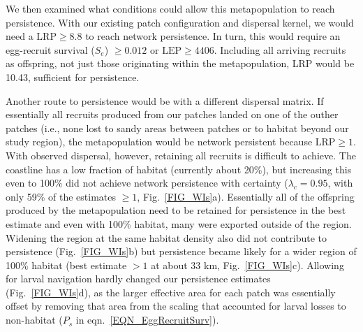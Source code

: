 \documentclass[12pt, oneside]{article}   	%
\begin{document}
We then examined what conditions could allow this metapopulation to reach persistence. With our existing patch configuration and dispersal kernel, we would need a $\text{LRP} \geq 8.8$ to reach network persistence. In turn, this would require an egg-recruit survival ($S_e$) $\geq 0.012$ or $\text{LEP} \geq 4406$. Including all arriving recruits as offspring, not just those originating within the metapopulation, LRP would be 10.43, sufficient for persistence. 
 
Another route to persistence would be with a different dispersal matrix. If essentially all recruits produced from our patches landed on one of the outher patches (i.e., none lost to sandy areas between patches or to habitat beyond our study region), the metapopulation would be network persistent because $\text{LRP} \geq 1$. With observed dispersal, however, retaining all recruits is difficult to achieve. The coastline has a low fraction of habitat (currently about 20\%), but increasing this even to 100\% did not achieve network persistence with certainty ($\lambda_c = 0.95$, with only 59\% of the estimates $\geq 1$, Fig.\ \ref{FIG_WIs}a). Essentially all of the offspring produced by the metapopulation need to be retained for persistence in the best estimate and even with 100\% habitat, many were exported outside of the region. Widening the region at the same habitat density also did not contribute to persistence (Fig.\ \ref{FIG_WIs}b) but persistence became likely for a wider region of 100\% habitat (best estimate $>1$ at about 33 km, Fig.\ \ref{FIG_WIs}c). Allowing for larval navigation hardly changed our persistence estimates (Fig.\ \ref{FIG_WIs}d), as the larger effective area for each patch was essentially offset by removing that area from the scaling that accounted for larval losses to non-habitat ($P_s$ in eqn.\ \ref{EQN_EggRecruitSurv}).


\end{document}
